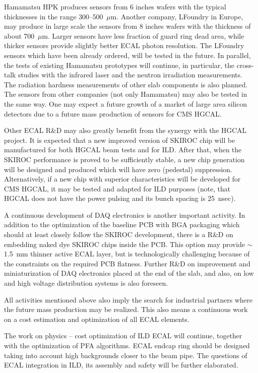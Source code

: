 \documentclass{article}
\begin{document}
Hamamatsu HPK produces sensors from 6 inches wafers with the typical
thicknesses in the range 300--500~$\mu$m. Another company, LFoundry in Europe,
may produce in large scale the sensors from 8 inches wafers with the thickness
of about 700~$\mu$m. Larger sensors have less fraction of guard ring dead
area, while thicker sensors provide slightly better ECAL photon
resolution. The LFoundry sensors which have been already ordered, will be
tested in the future.  In parallel, the tests of existing Hamamatsu prototypes
will continue, in particular, the cross-talk studies with the infrared laser
and the neutron irradiation measurements. The radiation hardness measurements
of other slab components is also planned. The sensors from other companies
(not only Hamamatsu) may also be tested in the same way. One may expect a
future growth of a market of large area silicon detectors due to a future mass
production of sensors for CMS HGCAL.

Other ECAL R\&D may also greatly benefit from the synergy with the HGCAL
project. It is expected that a new improved version of SKIROC chip will be
manufactured for both HGCAL beam tests and for ILD. After that, when the
SKIROC performance is proved to be sufficiently stable, a new chip generation
will be designed and produced which will have zero (pedestal) suppression.
Alternatively, if a new chip with superior characteristics will be developed
for CMS HGCAL, it may be tested and adapted for ILD purposes (note, that HGCAL
does not have the power pulsing and its bunch spacing is 25~nsec).

A continuous development of DAQ electronics is another important
activity. In addition to the optimization of the baseline PCB with BGA
packaging which should at least closely follow the SKIROC development, there
is a R\&D on embedding naked dye SKIROC chips inside the PCB. This option may
provide $\sim$1.5~mm thinner active ECAL layer, but is technologically
challenging because of the constraints on the required PCB flatness. Further
R\&D on improvement and miniaturization of DAQ electronics placed at the end
of the slab, and also, on low and high voltage distribution systems is also
foreseen.

All activities mentioned above also imply the search for industrial partners
where the future mass production may be realized. This also means a continuous
work on a cost estimation and optimization of all ECAL elements.

The work on physics -- cost optimization of ILD ECAL will continue, together
with the optimization of PFA algorithms. ECAL endcap ring should be designed
taking into account high backgrounds closer to the beam pipe. The questions of
ECAL integration in ILD, its assembly and safety will be further elaborated. 
\end{document}
